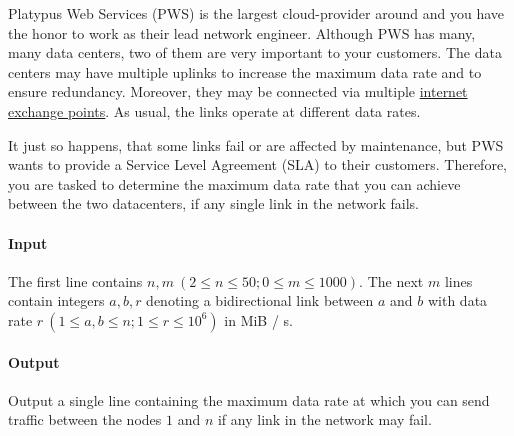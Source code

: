



\makeheader

Platypus Web Services (PWS) is the largest cloud-provider around and you have the honor to work as their lead network engineer.
Although PWS has many, many data centers, two of them are very important to your customers.
The data centers may have multiple uplinks to increase the maximum data rate and to ensure redundancy.
Moreover, they may be connected via multiple \href{https://en.wikipedia.org/wiki/Internet_exchange_point}{internet exchange points}.
As usual, the links operate at different data rates.

It just so happens, that some links fail or are affected by maintenance, but PWS wants to provide a Service Level Agreement (SLA) to their customers.
Therefore, you are tasked to determine the maximum data rate that you can achieve between the two datacenters, if any single link in the network fails.

\paragraph*{Input}

The first line contains $n, m ~ (2 \leq n \leq 50; 0 \leq m \leq 1000)$. The next $m$ lines
contain integers $a, b, r$ denoting a bidirectional link between $a$ and $b$ with data rate $r ~ (1 \leq a, b \leq n;
1 \leq r \leq 10^6)$ in MiB / s.

\paragraph*{Output}

Output a single line containing the maximum data rate at which you can send traffic between the nodes $1$ and $n$
if any link in the network may fail.

\begin{samples}
\end{samples}


